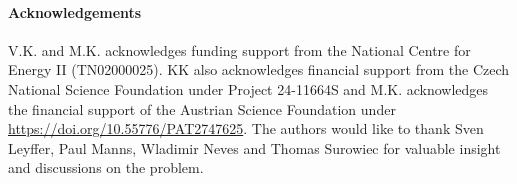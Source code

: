 \documentclass{article}
\newcommand{\1}{\mathds{1}}          %
\theoremstyle{definition}
\begin{document}
\begin{sloppypar}





\paragraph*{Acknowledgements}
V.K. and M.K. acknowledges funding support from the National Centre for Energy II (TN02000025). KK also acknowledges financial support from the Czech National Science Foundation under Project 24-11664S and M.K. acknowledges the financial support of the Austrian Science Foundation under \url{https://doi.org/10.55776/PAT2747625}. The authors would like to thank Sven Leyffer, Paul Manns, Wladimir Neves and Thomas Surowiec for valuable insight and discussions on the problem. 


\end{sloppypar}




\end{document}

